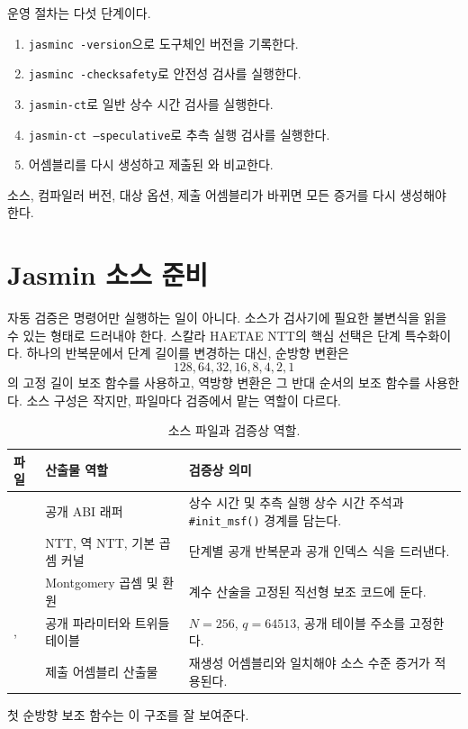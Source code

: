 \documentclass[10pt,twocolumn]{article}
\newcommand{\haetae}{HAETAE}
\newcommand{\jasmin}{Jasmin}
\newcommand{\ct}{상수 시간}
\newcommand{\sct}{추측 실행 상수 시간}
\begin{document}
운영 절차는 다섯 단계이다.
\begin{enumerate}
  \item \texttt{jasminc -version}으로 도구체인 버전을 기록한다.
  \item \texttt{jasminc -checksafety}로 안전성 검사를 실행한다.
  \item \texttt{jasmin-ct}로 일반 \ct{} 검사를 실행한다.
  \item \texttt{jasmin-ct --speculative}로 추측 실행 검사를 실행한다.
  \item 어셈블리를 다시 생성하고 제출된 와 비교한다.
\end{enumerate}
소스, 컴파일러 버전, 대상 옵션, 제출 어셈블리가 바뀌면 모든 증거를
다시 생성해야 한다.

\section{\jasmin{} 소스 준비}

자동 검증은 명령어만 실행하는 일이 아니다. 소스가 검사기에 필요한
불변식을 읽을 수 있는 형태로 드러내야 한다. 스칼라 \haetae{} NTT의 핵심
선택은 단계 특수화이다. 하나의 반복문에서 단계 길이를 변경하는 대신,
순방향 변환은
\[
  128,64,32,16,8,4,2,1
\]
의 고정 길이 보조 함수를 사용하고, 역방향 변환은 그 반대 순서의 보조
함수를 사용한다. 소스 구성은 작지만, 파일마다 검증에서 맡는 역할이
다르다.

\begin{table}[t]
\centering
\scriptsize
\setlength{\tabcolsep}{3pt}
\begin{tabular}{P{0.25\columnwidth}P{0.30\columnwidth}P{0.35\columnwidth}}
\toprule
파일 & 산출물 역할 & 검증상 의미 \tabularnewline
\midrule
{} & 공개 ABI 래퍼 & \ct{} 및 \sct{} 주석과
\texttt{\#init\_msf()} 경계를 담는다. \tabularnewline
{} & NTT, 역 NTT, 기본 곱셈 커널 & 단계별 공개 반복문과
공개 인덱스 식을 드러낸다. \tabularnewline
{} & Montgomery 곱셈 및 환원 & 계수 산술을 고정된
직선형 보조 코드에 둔다. \tabularnewline
{},  & 공개 파라미터와 트위들 테이블 &
\(N=256\), \(q=64513\), 공개 테이블 주소를 고정한다. \tabularnewline
{} & 제출 어셈블리 산출물 & 재생성 어셈블리와 일치해야
소스 수준 증거가 적용된다. \tabularnewline
\bottomrule
\end{tabular}
\caption{소스 파일과 검증상 역할.}
\label{tab:ko-source-roles}
\end{table}

첫 순방향 보조 함수는 이 구조를 잘 보여준다.
\end{document}
